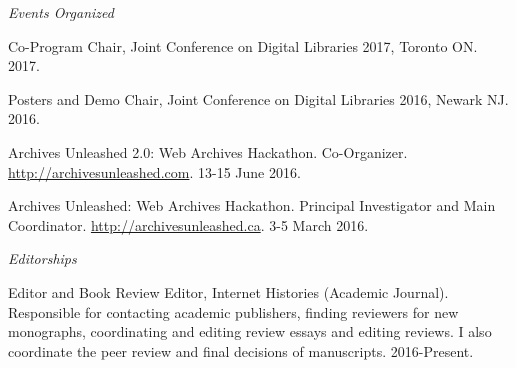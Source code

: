 \documentclass[11pt,article,oneside]{memoir}
\begin{document}
%
\bigskip

\medskip
\noindent\emph{Events Organized \vspace{0.01in}}

\ind Co-Program Chair, Joint Conference on Digital Libraries 2017, Toronto ON. 2017.

\ind Posters and Demo Chair, Joint Conference on Digital Libraries 2016, Newark NJ. 2016.

\ind Archives Unleashed 2.0: Web Archives Hackathon. Co-Organizer. \href{http://archivesunleashed.com/}{http://archivesunleashed.com}. 13-15 June 2016.

\ind Archives Unleashed: Web Archives Hackathon. Principal Investigator and Main Coordinator. \href{http://archivesunleashed.ca/}{http://archivesunleashed.ca}. 3-5 March 2016.

\medskip

\noindent\emph{Editorships \vspace{0.01in}}

\ind Editor and Book Review Editor, Internet Histories (Academic Journal). Responsible for contacting academic publishers, finding reviewers for new monographs, coordinating and editing review essays and editing reviews. I also coordinate the peer review and final decisions of manuscripts. 2016-Present.
\end{document}
